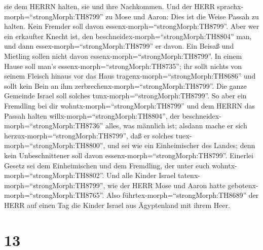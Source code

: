 sie dem HERRN halten, sie und ihre Nachkommen.  Und der
HERR sprachx-morph=``strongMorph:TH8799'' zu Mose und Aaron: Dies ist
die Weise Passah zu halten. Kein Fremder soll davon
essenx-morph=``strongMorph:TH8799''.  Aber wer ein
erkaufter Knecht ist, den beschneidex-morph=``strongMorph:TH8804'' man,
und dann essex-morph=``strongMorph:TH8799'' er davon.  Ein
Beisaß und Mietling sollen nicht davon
essenx-morph=``strongMorph:TH8799''.  In einem Hause soll
man's essenx-morph=``strongMorph:TH8735''; ihr sollt nichts von seinem
Fleisch hinaus vor das Haus tragenx-morph=``strongMorph:TH8686'' und
sollt kein Bein an ihm zerbrechenx-morph=``strongMorph:TH8799''.
 Die ganze Gemeinde Israel soll solches
tunx-morph=``strongMorph:TH8799''.  So aber ein Fremdling
bei dir wohntx-morph=``strongMorph:TH8799'' und dem HERRN das Passah
halten willx-morph=``strongMorph:TH8804'', der
beschneidex-morph=``strongMorph:TH8736'' alles, was männlich ist;
alsdann mache er sich herzux-morph=``strongMorph:TH8799'', daß er
solches tuex-morph=``strongMorph:TH8800'', und sei wie ein Einheimischer
des Landes; denn kein Unbeschnittener soll davon
essenx-morph=``strongMorph:TH8799''.  Einerlei Gesetz sei
dem Einheimischen und dem Fremdling, der unter euch
wohntx-morph=``strongMorph:TH8802''.  Und alle Kinder
Israel tatenx-morph=``strongMorph:TH8799'', wie der HERR Mose und Aaron
hatte gebotenx-morph=``strongMorph:TH8765''.  Also
führtex-morph=``strongMorph:TH8689'' der HERR auf einen Tag die Kinder
Israel aus Ägyptenland mit ihrem Heer.

\hypertarget{section-12}{%
\section{13}\label{section-12}}

